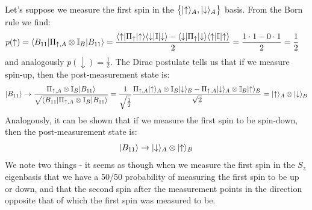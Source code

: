 Let's suppose we measure the first spin in the $\set{\lvert \uparrow \rangle_A, \lvert \downarrow \rangle_A}$ basis. From the Born rule we find:
\begin{equation}
    \begin{split}
        p(\uparrow) = \langle B_{11} \rvert\Pi_{\uparrow, A} \otimes \mathbb{I}_B\lvert B_{11} \rangle &= \frac{\langle \uparrow \rvert\Pi_{\uparrow}\lvert \uparrow \rangle\langle \downarrow \rvert\mathbb{I}\lvert \downarrow \rangle - \langle \downarrow \rvert\Pi_{\uparrow}\lvert \downarrow \rangle\langle \uparrow \rvert\mathbb{I}\lvert \uparrow \rangle}{2} = \frac{1 \cdot 1 - 0 \cdot 1}{2} = \frac{1}{2}
    \end{split}
\end{equation}
and analogously $p(\downarrow) = \frac{1}{2}$. The Dirac postulate tells us that if we measure spin-up, then the post-measurement state is:
\begin{equation}
    \lvert B_{11} \rangle \to \frac{\Pi_{\uparrow, A} \otimes \mathbb{I}_B\lvert B_{11} \rangle}{\sqrt{\langle B_{11} \rvert\Pi_{\uparrow, A} \otimes \mathbb{I}_B\lvert B_{11} \rangle}} = \frac{1}{\sqrt{\frac{1}{2}}} \frac{\Pi_{\uparrow, A}\lvert \uparrow \rangle_A \otimes \mathbb{I}_B\lvert \downarrow \rangle_B - \Pi_{\uparrow, A}\lvert \downarrow \rangle_A \otimes \mathbb{I}_B\lvert \uparrow \rangle_B}{\sqrt{2}} = \lvert \uparrow \rangle_A \otimes \lvert \downarrow \rangle_B
\end{equation}
Analogously, it can be shown that if we measure the first spin to be spin-down, then the post-measurement state is:
\begin{equation}
    \lvert B_{11} \rangle \to \lvert \downarrow \rangle_A \otimes \lvert \uparrow \rangle_B
\end{equation}
We note two things - it seems as though when we measure the first spin in the $S_z$ eigenbasis that we have a 50/50 probability of measuring the first spin to be up or down, and that the second spin after the measurement points in the direction opposite that of which the first spin was measured to be.


